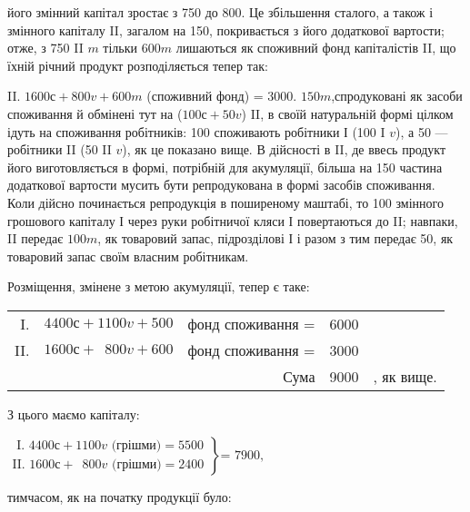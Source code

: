\parcont{}  %
його змінний капітал зростає з 750 до 800. Це збільшення сталого, а
також і змінного капіталу II, загалом на 150, покривається з його додаткової
вартости; отже, з 750 II $m$ тільки $600 m$ лишаються як споживний
фонд капіталістів II, що їхній річний продукт розподіляється тепер
так:

II. $1600 с + 800 v + 600m$ (споживний фонд) = 3000.    $150 m$,спродуковані
як засоби споживання й обмінені тут на ($100 с + 50 v$) II,
в своїй натуральній формі цілком ідуть на споживання робітників: 100
споживають робітники І (100 I $v$), а 50 — робітники II (50 II $v$), як це
показано вище. В дійсності в II, де ввесь продукт його виготовляється
в формі, потрібній для акумуляції, більша на 150 частина додаткової
вартости мусить бути репродукована в формі  засобів
споживання. Коли дійсно починається репродукція в поширеному
маштабі, то 100 змінного грошового капіталу І через руки робітничої
кляси І повертаються до II; навпаки, II передає $100 m$, як товаровий
запас, підрозділові І і разом з тим передає 50, як товаровий запас своїм
власним робітникам.

Розміщення, змінене з метою акумуляції, тепер є таке:
\begin{table}[h]
  \begin{center}
  \begin{tabular}{r@{ } l@{ } r@{ } r@{ } l}
    I. & $4400 с + 1100 v + 500 $& фонд споживання = & 6000 & \\

    II. & $1600 с + \phantom{0}800 v + 600 $& фонд споживання = & 3000 & \\
    \cmidrule(r){3-5}
        &                                            & Сума      & 9000 &, як вище.
  \end{tabular}
  \end{center}
\end{table}

З цього маємо капіталу:
\begin{center}
$
 \left.\begin{aligned}
        \text{ I. }4400 с + 1100 v \text{ (грішми)} = 5500\\
        \text{II. }1600 с + \phantom{0}800 v \text{ (грішми)} = 2400
       \end{aligned}
 \right\}
 \text{= 7900,}
$
\end{center}

тимчасом, як на початку продукції було:

